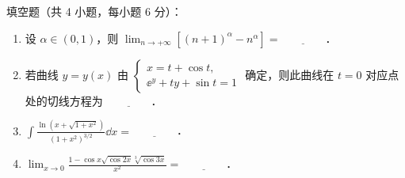 
填空题（共 4 小题，每小题 6 分）：
\begin{enumerate}[label=(\arabic*)]
  \item 设 $\alpha\in(0,1)$，则 $\displaystyle\lim_{n\to+\infty}\left[(n+1)^{\alpha}-n^{\alpha}\right]=\underline{\qquad\qquad}$．
  \item 若曲线 $y=y(x)$ 由 $\begin{cases}x=t+\cos t,\\ \ee^{y}+ty+\sin t=1\end{cases}$ 确定，则此曲线在 $t=0$ 对应点处的切线方程为 $\underline{\qquad\qquad}$．
  \item $\displaystyle\int\frac{\ln\left(x+\sqrt{1+x^{2}}\right)}{\left(1+x^{2}\right)^{3/2}}\dd x=\underline{\qquad\qquad}$．
  \item $\displaystyle\lim_{x\to 0}\frac{1-\cos x\sqrt{\cos 2x}\sqrt[3]{\cos 3x}}{x^{2}}=\underline{\qquad\qquad}$．
\end{enumerate}
